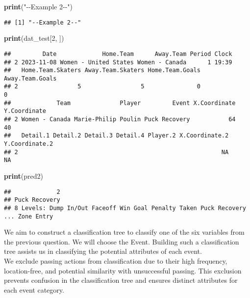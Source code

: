 \documentclass[
  a3paper,
]{article}
\newenvironment{Shaded}{\begin{snugshade}}{\end{snugshade}}
\newcommand{\DecValTok}[1]{\textcolor[rgb]{0.00,0.00,0.81}{#1}}
\newcommand{\FunctionTok}[1]{\textcolor[rgb]{0.13,0.29,0.53}{\textbf{#1}}}
\newcommand{\NormalTok}[1]{#1}
\newcommand{\StringTok}[1]{\textcolor[rgb]{0.31,0.60,0.02}{#1}}
\begin{document}
\begin{Shaded}
\begin{Highlighting}[]
\FunctionTok{print}\NormalTok{(}\StringTok{"{-}{-}Example 2{-}{-}"}\NormalTok{)}
\end{Highlighting}
\end{Shaded}

\begin{verbatim}
## [1] "--Example 2--"
\end{verbatim}

\begin{Shaded}
\begin{Highlighting}[]
\FunctionTok{print}\NormalTok{(dat\_test[}\DecValTok{2}\NormalTok{, ])}
\end{Highlighting}
\end{Shaded}

\begin{verbatim}
##         Date             Home.Team      Away.Team Period Clock
## 2 2023-11-08 Women - United States Women - Canada      1 19:39
##   Home.Team.Skaters Away.Team.Skaters Home.Team.Goals Away.Team.Goals
## 2                 5                 5               0               0
##             Team              Player         Event X.Coordinate Y.Coordinate
## 2 Women - Canada Marie-Philip Poulin Puck Recovery           64           40
##   Detail.1 Detail.2 Detail.3 Detail.4 Player.2 X.Coordinate.2 Y.Coordinate.2
## 2                                                          NA             NA
\end{verbatim}

\begin{Shaded}
\begin{Highlighting}[]
\FunctionTok{print}\NormalTok{(pred2)}
\end{Highlighting}
\end{Shaded}

\begin{verbatim}
##             2 
## Puck Recovery 
## 8 Levels: Dump In/Out Faceoff Win Goal Penalty Taken Puck Recovery ... Zone Entry
\end{verbatim}

We aim to construct a classification tree to classify one of the six
variables from the previous question. We will choose the Event. Building
such a classification tree assists us in classifying the potential
attributes of each event.\\

We exclude passing actions from classification due to their high
frequency, location-free, and potential similarity with unsuccessful
passing. This exclusion prevents confusion in the classification tree
and ensures distinct attributes for each event category.\\
\end{document}
